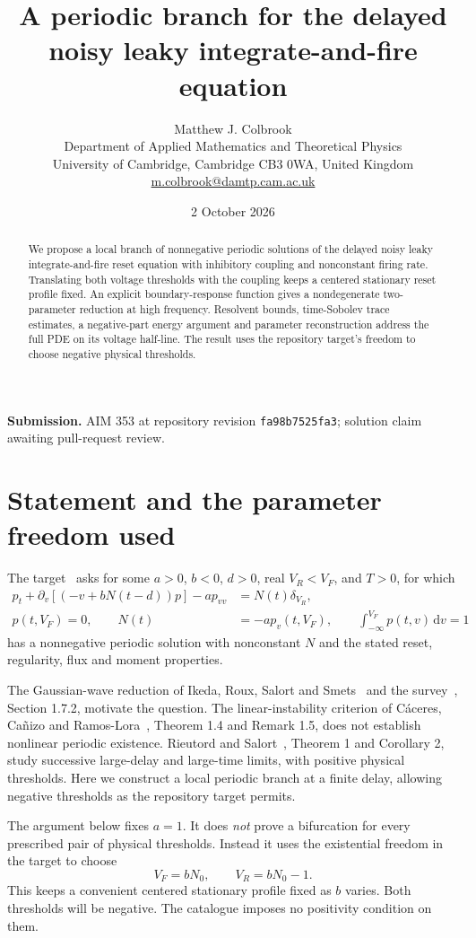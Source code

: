 \documentclass[11pt,a4paper]{article}
\title{\textbf{A periodic branch for the delayed\\noisy leaky integrate-and-fire equation}}
\author{Matthew J. Colbrook\\[3pt]
\small Department of Applied Mathematics and Theoretical Physics\\
\small University of Cambridge, Cambridge CB3 0WA, United Kingdom\\
\small \href{mailto:m.colbrook@damtp.cam.ac.uk}{m.colbrook@damtp.cam.ac.uk}}
\date{2 October 2026}
\numberwithin{equation}{section}
\theoremstyle{remark}\newtheorem{remark}[theorem]{Remark}
\newcommand{\dd}{\,\mathrm d}
\begin{document}
\maketitle
\begin{abstract}
We propose a local branch of nonnegative periodic solutions of the delayed noisy leaky integrate-and-fire reset equation with inhibitory coupling and nonconstant firing rate. Translating both voltage thresholds with the coupling keeps a centered stationary reset profile fixed. An explicit boundary-response function gives a nondegenerate two-parameter reduction at high frequency. Resolvent bounds, time-Sobolev trace estimates, a negative-part energy argument and parameter reconstruction address the full PDE on its voltage half-line. The result uses the repository target's freedom to choose negative physical thresholds.
\end{abstract}
\smallskip
\noindent\textbf{Submission.} AIM 353 at repository revision \texttt{fa98b7525fa3}; solution claim awaiting pull-request review.

\section{Statement and the parameter freedom used}
The target~\cite{nnlifentry} asks for some $a>0$, $b<0$, $d>0$, real $V_R<V_F$, and $T>0$, for which
\begin{align}
 p_t+\partial_v[(-v+bN(t-d))p]-a p_{vv}&=N(t)\delta_{V_R},\label{eq:physical}\\
 p(t,V_F)=0,\qquad N(t)&=-a p_v(t,V_F),\qquad
 \int_{-\infty}^{V_F}p(t,v)\dd v=1\label{eq:physical-bc}
\end{align}
has a nonnegative periodic solution with nonconstant $N$ and the stated reset, regularity, flux and moment properties.


The Gaussian-wave reduction of Ikeda, Roux, Salort and Smets~\cite{ikeda} and the survey~\cite{crsurvey}, Section 1.7.2, motivate the question. The linear-instability criterion of C\'aceres, Ca\~nizo and Ramos-Lora~\cite{ccr}, Theorem 1.4 and Remark 1.5, does not establish nonlinear periodic existence. Rieutord and Salort~\cite{rs}, Theorem 1 and Corollary 2, study successive large-delay and large-time limits, with positive physical thresholds. Here we construct a local periodic branch at a finite delay, allowing negative thresholds as the repository target permits.

The argument below fixes $a=1$. It does \emph{not} prove a bifurcation for every prescribed pair of physical thresholds. Instead it uses the existential freedom in the target to choose
\begin{equation}\label{eq:threshold-family}
 V_F=bN_0,\qquad V_R=bN_0-1.
\end{equation}
This keeps a convenient centered stationary profile fixed as $b$ varies. Both thresholds will be negative. The catalogue imposes no positivity condition on them.
\end{document}
